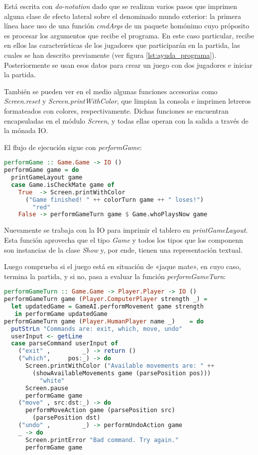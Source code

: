 \documentclass{llncs}
\begin{document}
Está escrita con \textit{do-notation} dado que se realizan varios pasos que imprimen alguna clase de efecto lateral sobre el denominado mundo exterior: la primera línea hace uso de una función \textit{cmdArgs} de un paquete homónimo cuyo próposito es procesar los argumentos que recibe el programa. En este caso particular, recibe en ellos las características de los jugadores que participarán en la partida, las cuales se han descrito previamente (ver figura \ref{lst:ayuda_programa}). Posteriormente se usan esos datos para crear un juego con dos jugadores e iniciar la partida.

También se pueden ver en el medio algunas funciones accesorias como \textit{Screen.reset} y \textit{Screen.printWithColor}, que limpian la consola e imprimen letreros formateados con colores, respectivamente. Dichas funciones se encuentran encapsuladas en el módulo \textit{Screen}, y todas ellas operan con la salida a través de la mónada IO.

El flujo de ejecución sigue con \textit{performGame}:

\begin{lstlisting}[frame=single, language=haskell, captionpos=b, caption=Función performGame, label={lst:perform_game}]
performGame :: Game.Game -> IO ()
performGame game = do
  printGameLayout game
  case Game.isCheckMate game of
    True  -> Screen.printWithColor
      ("Game finished! " ++ colorTurn game ++ " loses!")
        "red"
    False -> performGameTurn game $ Game.whoPlaysNow game
\end{lstlisting}

Nuevamente se trabaja con la IO para imprimir el tablero en \textit{printGameLayout}. Esta función aprovecha que el tipo \textit{Game} y todos los tipos que los componenn son instancias de la clase \textit{Show} y, por ende, tienen una representación textual.

Luego comprueba si el juego está en situación de «jaque mate», en cuyo caso, termina la partida, y si no, pasa a evaluar la función \textit{performGameTurn}:

\begin{lstlisting}[frame=single, language=haskell, captionpos=b, caption=Función performGameTurn, label={lst:perform_game_turn}]
performGameTurn :: Game.Game -> Player.Player -> IO ()
performGameTurn game (Player.ComputerPlayer strength _) =
  let updatedGame = GameAI.performMovement game strength
   in performGame updatedGame
performGameTurn game (Player.HumanPlayer name _)    = do
  putStrLn "Commands are: exit, which, move, undo"
  userInput <- getLine
  case parseCommand userInput of
    ("exit" ,         _) -> return ()
    ("which",     pos:_) -> do
      Screen.printWithColor ("Available movements are: " ++
        (showAvailableMovements game (parsePosition pos)))
          "white"
      Screen.pause
      performGame game
    ("move" , src:dst:_) -> do
      performMoveAction game (parsePosition src)
        (parsePosition dst)
    ("undo" ,         _) -> performUndoAction game
    _ -> do
      Screen.printError "Bad command. Try again."
      performGame game
\end{lstlisting}
\end{document}
